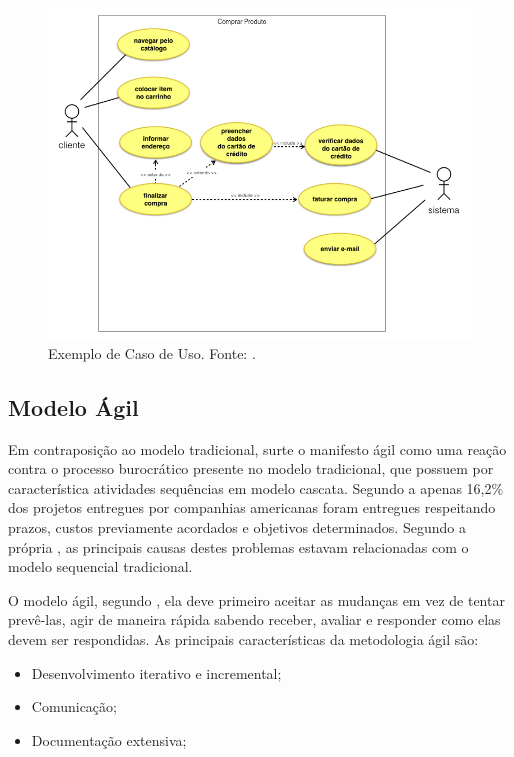 \begin{figure}[H]
	\centering
	\includegraphics[width=1.0\textwidth]{figuras/caso_de_uso_exemplo.png}
	\caption{Exemplo de Caso de Uso. Fonte: \cite{casos_de_uso}.}
	\label{img:exemplo_caso_de_uso}
\end{figure}

\subsection{Modelo Ágil}
\label{sec:modelo_agil}

Em contraposição ao modelo tradicional, surte o manifesto ágil como uma reação contra o processo burocrático presente no modelo tradicional, que possuem por característica atividades sequências em modelo cascata. Segundo a \cite{chaos} apenas 16,2\% dos projetos entregues por companhias americanas foram entregues respeitando prazos, custos previamente acordados e objetivos determinados. Segundo a própria \cite{chaos}, as principais causas destes problemas estavam relacionadas com o modelo sequencial tradicional.

O modelo ágil, segundo \cite{soares}, ela deve primeiro aceitar as mudanças em vez de tentar prevê-las, agir de maneira rápida sabendo receber, avaliar e responder como elas devem ser respondidas. As principais características da metodologia ágil são:

\begin{itemize}
	\item Desenvolvimento iterativo e incremental;
	\item Comunicação;
	\item Documentação extensiva; 
\end{itemize}

